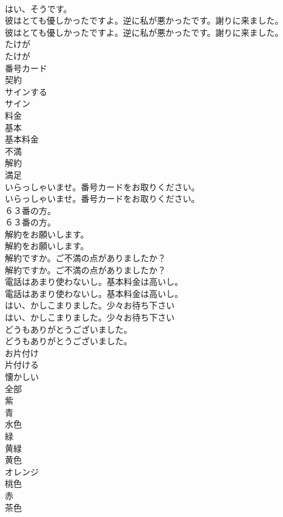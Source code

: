 \documentclass[8pt]{extreport}
\begin{document}
\begin{CJK}{UTF8}{min}
\\	はい、そうです。 
\\	彼はとても優しかったですよ。逆に私が悪かったです。謝りに来ました。	
\\	彼はとても優しかったですよ。逆に私が悪かったです。謝りに来ました。 
\\	たけが
\\	たけが
\\	番号カード
\\	契約
\\	サインする
\\	サイン
\\	料金
\\	基本
\\	基本料金
\\	不満
\\	解約
\\	満足
\\	いらっしゃいませ。番号カードをお取りください。	
\\	いらっしゃいませ。番号カードをお取りください。 
\\	６３番の方。	
\\	６３番の方。 
\\	解約をお願いします。	
\\	解約をお願いします。 
\\	解約ですか。ご不満の点がありましたか？	
\\	解約ですか。ご不満の点がありましたか？ 
\\	電話はあまり使わないし。基本料金は高いし。	
\\	電話はあまり使わないし。基本料金は高いし。 
\\	はい、かしこまりました。少々お待ち下さい
\\	はい、かしこまりました。少々お待ち下さい
\\	どうもありがとうございました。	
\\	どうもありがとうございました。 
\\	お片付け
\\	片付ける
\\	懐かしい
\\	全部
\\	紫
\\	青
\\	水色
\\	緑
\\	黄緑
\\	黄色
\\	オレンジ
\\	桃色
\\	赤
\\	茶色

\end{CJK}
\end{document}
